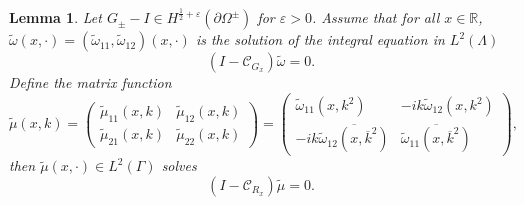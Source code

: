 \documentclass[preprint,compress,12pt]{elsarticle}
\newtheorem{lemma}[theorem]{Lemma}
\numberwithin{equation}{section}
\begin{document}
\begin{lemma}\label{munu}
Let $G_{\pm}-I\in H^{\frac{1}{2}+\varepsilon}(\partial\Omega^{\pm})$ for $\varepsilon>0$. Assume that for all $x\in\mathbb{R}$,  $\tilde{\omega}(x,\cdot)=(\tilde{\omega}_{11},\tilde{\omega}_{12})(x,\cdot)$ is the solution of the integral equation in $L^{2}(\Lambda)$
\begin{equation}\label{guu}
\left(I-\mathcal{C}_{G_{x}}\right)\tilde{\omega}=0.
\end{equation}
Define the matrix function
\begin{equation}\label{tilde}
\tilde{\mu}(x,k)=\begin{pmatrix}\tilde{\mu}_{11}(x,k)&\tilde{\mu}_{12}(x,k)\\
\tilde{\mu}_{21}(x,k)&\tilde{\mu}_{22}(x,k)\end{pmatrix}=\begin{pmatrix}\tilde{\omega}_{11}(x,k^{2})&-ik\tilde{\omega}_{12}(x,k^{2})\\
-ik\overline{\tilde{\omega}_{12}(x,\overline{k}^{2})}&\overline{\tilde{\omega}_{11}(x,\overline{k}^{2})}\end{pmatrix},
\end{equation}
then
$\tilde{\mu}(x,\cdot)\in L^{2}(\Gamma)$ solves
\begin{equation}\label{gus}
\left(I-\mathcal{C}_{R_{x}}\right)\tilde{\mu}=0.
\end{equation}
\end{lemma}
\end{document}
